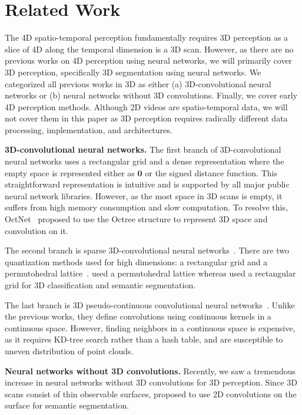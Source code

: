 \section{Related Work}

The 4D spatio-temporal perception fundamentally requires 3D perception as a slice of 4D along the temporal dimension is a 3D scan. However, as there are no previous works on 4D perception using neural networks, we will primarily cover 3D perception, specifically 3D segmentation using neural networks. We categorized all previous works in 3D as either (a) 3D-convolutional neural networks or (b) neural networks without 3D convolutions. Finally, we cover early 4D perception methods. Although 2D videos are spatio-temporal data, we will not cover them in this paper as 3D perception requires radically different data processing, implementation, and architectures.

\textbf{3D-convolutional neural networks.}
The first branch of 3D-convolutional neural networks uses a rectangular grid and a dense representation \cite{segcloud, scannet} where the empty space is represented either as $\mathbf{0}$ or the signed distance function. This straightforward representation is intuitive and is supported by all major public neural network libraries. However, as the most space in 3D scans is empty, it suffers from high memory consumption and slow computation. To resolve this, OctNet~\cite{octnet} proposed to use the Octree structure to represent 3D space and convolution on it.

The second branch is sparse 3D-convolutional neural networks~\cite{splatnet, sparse3dcnn}. There are two quantization methods used for high dimensions: a rectangular grid and a permutohedral lattice~\cite{permutohedral}. \cite{splatnet} used a permutohedral lattice whereas \cite{sparse3dcnn} used a rectangular grid for 3D classification and semantic segmentation.

The last branch is 3D pseudo-continuous convolutional neural networks~\cite{montecarlo, pointcnn}. Unlike the previous works, they define convolutions using continuous kernels in a continuous space. However, finding neighbors in a continuous space is expensive, as it requires KD-tree search rather than a hash table, and are susceptible to uneven distribution of point clouds.


\textbf{Neural networks without 3D convolutions.}
Recently, we saw a tremendous increase in neural networks without 3D convolutions for 3D perception. Since 3D scans consist of thin observable surfaces, \cite{surface, tangent} proposed to use 2D convolutions on the surface for semantic segmentation.

